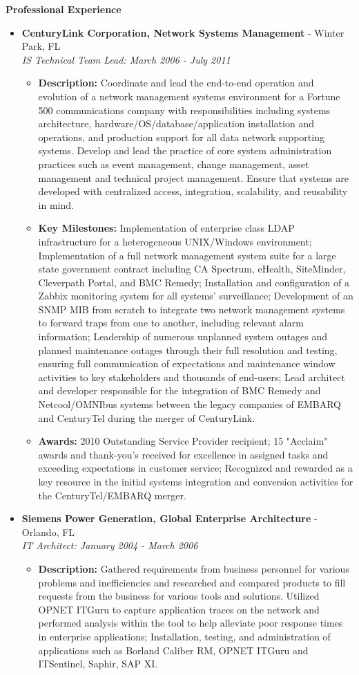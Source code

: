\documentclass[10pt,oneside]{article}
\newenvironment{ressection}[1]{
  \vspace{4pt}
  \textbf{\selectfont\normalsize#1}
  \begin{itemize}
  \vspace{3pt}
}{
  \end{itemize}
}
\newcommand{\ressubitem}[1]{
  \vspace{-1pt}
  \item \begin{flushleft} #1 \end{flushleft}
}
\newcommand{\resbigitem}[3]{
  \vspace{-5pt}
  \item
  \textbf{#1} - #2 \\
  \textit{#3}
}
\newenvironment{ressubsec}[3]{
  \resbigitem{#1}{#2}{#3}
  \vspace{-2pt}
  \begin{itemize}
}{
  \end{itemize}
}
\begin{document}
\begin{ressection}{Professional Experience}
\begin{ressubsec}{CenturyLink Corporation, Network Systems Management}{Winter Park, FL}{IS Technical Team Lead: March 2006 - July 2011}
    \ressubitem{\textbf{Description:} Coordinate and lead the end-to-end operation and evolution of a network management systems environment for a Fortune 500 communications company with responsibilities including systems architecture, hardware/OS/database/application installation and operations, and production support for all data network supporting systems.  Develop and lead the practice of core system administration practices such as event management, change management, asset management and technical project management. Ensure that systems are developed with centralized access, integration, scalability, and reusability in mind.}

    \ressubitem{\textbf{Key Milestones:} Implementation of enterprise class LDAP infrastructure for a heterogeneous UNIX/Windows environment; Implementation of a full network management system suite for a large state government contract including CA Spectrum, eHealth, SiteMinder, Cleverpath Portal, and BMC Remedy; Installation and configuration of a Zabbix monitoring system for all systems' surveillance; Development of an SNMP MIB from scratch to integrate two network management systems to forward traps from one to another, including relevant alarm information; Leadership of numerous unplanned system outages and planned maintenance outages through their full resolution and testing, ensuring full communication of expectations and maintenance window activities to key stakeholders and thousands of end-users; Lead architect and developer responsible for the integration of BMC Remedy and Netcool/OMNIbus systems between the legacy companies of EMBARQ and CenturyTel during the merger of CenturyLink.}

    \ressubitem{\textbf{Awards:} 2010 Outstanding Service Provider recipient; 15 "Acclaim" awards and thank-you's received for excellence in assigned tasks and exceeding expectations in customer service; Recognized and rewarded as a key resource in the initial systems integration and conversion activities for the CenturyTel/EMBARQ merger.}

  \end{ressubsec}

  \begin{ressubsec}{Siemens Power Generation, Global Enterprise Architecture}{Orlando, FL}{IT Architect: January 2004 - March 2006}

    \ressubitem{\textbf{Description:} Gathered requirements from business personnel for various problems and inefficiencies and researched and compared products to fill requests from the business for various tools and solutions. Utilized OPNET ITGuru to capture application traces on the network and performed analysis within the tool to help alleviate poor response times in enterprise applications; Installation, testing, and administration of applications such as Borland Caliber RM, OPNET ITGuru and ITSentinel, Saphir, SAP XI.}

  \end{ressubsec}

\end{ressection}
\end{document}

